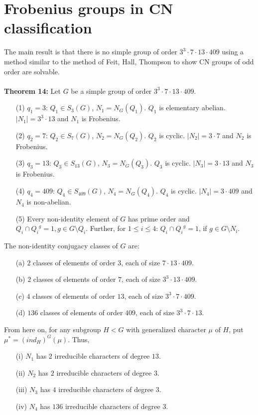 \section {Frobenius groups in CN classification}
The main result is that there is no simple group of order $3^3 \cdot 7 \cdot 13 \cdot 409$ using a method similar to 
the method of Feit, Hall, Thompson to show CN groups of odd order are solvable.
\\
\\
{\bf Theorem 14:}
Let $G$ be a simple group of order $3^3 \cdot 7 \cdot 13 \cdot 409$.
\begin{itemize}
\item[(1)] $q_1 =3$: $Q_1 \in S_3(G)$, $N_1 = N_G(Q_1)$.  $Q_1$ is elementary abelian. $|N_1|= 3^3 \cdot 13$ and $N_1$ is Frobenius.
\item[(2)] $q_2 =7$: $Q_2 \in S_7(G)$, $N_2 = N_G(Q_2)$.  $Q_2$ is cyclic. $|N_2|= 3 \cdot 7$ and $N_2$ is Frobenius.
\item[(3)] $q_3 = 13$: $Q_{3} \in S_{13}(G)$, $N_3 = N_G(Q_3)$.  $Q_3$ is cyclic. $|N_3|= 3 \cdot 13$ and $N_3$ is Frobenius.
\item[(4)] $q_4 = 409$: $Q_4 \in S_{409}(G)$, $N_4 = N_G(Q_4)$.  $Q_4$ is cyclic. $|N_4|= 3 \cdot 409$  and $N_4$ is non-abelian.
\item[(5)] Every non-identity element of $G$ has prime order and $Q_i \cap {Q_i}^g = 1, g \in G \setminus Q_i$.  Further, for
$1 \leq i \leq 4$: $Q_i \cap {Q_i}^g = 1$, if $g \in G \setminus N_i$.
\end{itemize}
The non-identity conjugacy classes of $G$ are:
\begin{itemize}
\item[(a)] $2$ classes of elements of order $3$, each of size $7 \cdot 13 \cdot 409$.
\item[(b)] $2$ classes of elements of order $7$, each of size $3^3 \cdot 13 \cdot 409$.
\item[(c)] $4$ classes of elements of order $13$, each of size $3^3 \cdot 7 \cdot 409$.
\item[(d)] $136$ classes of elements of order $409$, each of size $3^3 \cdot 7 \cdot 13$.
\end{itemize}
From here on, for any subgroup $H < G$ with generalized character $\mu$ of $H$, put
$\mu^* = (ind_H)^G(\mu)$.
Thus,
\begin{itemize}
\item[(i)] $N_1$ has $2$ irreducible characters of degree $13$.
\item[(ii)] $N_2$ has $2$ irreducible characters of degree $3$.
\item[(iii)] $N_3$ has $4$ irreducible characters of degree $3$.
\item[(iv)] $N_4$ has $136$ irreducible characters of degree $3$.
\end{itemize}
